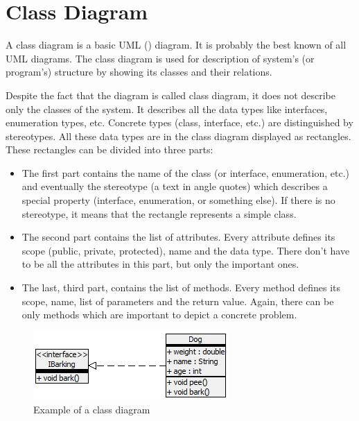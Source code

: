 
\chapter{Class Diagram}
\label{section:classDiagramDescription}

A class diagram is a basic UML (\cite{UMLWeb}) diagram. It is probably the best known of all UML diagrams. The class diagram is used for description of system's (or program's) structure by showing its classes and their relations. 

Despite the fact that the diagram is called class diagram, it does not describe only the classes of the system. It describes all the data types like interfaces, enumeration types, etc. Concrete types (class, interface, etc.) are distinguished by stereotypes. All these data types are in the class diagram displayed as rectangles. These rectangles can be divided into three parts: 
\begin{itemize}
    \item The first part contains the name of the class (or interface, enumeration, etc.) and eventually the stereotype (a text in \guillemotleft angle quotes\guillemotright) which describes a special property (interface, enumeration, or something else). If there is no stereotype, it means that the rectangle represents a simple class.
    \item The second part contains the list of attributes. Every attribute defines its scope (public, private, protected), name and the data type. There don't have to be all the attributes in this part, but only the important ones.
    \item The last, third part, contains the list of methods. Every method defines its scope, name, list of parameters and the return value. Again, there can be only methods which are important to depict a concrete problem.
\end{itemize}

\begin{figure}[!ht]
\begin{center}
\includegraphics[]{img/classDiagramExample.png}
\caption{Example of a class diagram}
\label{f-classDiagramExample}
\end{center}
\end{figure}

